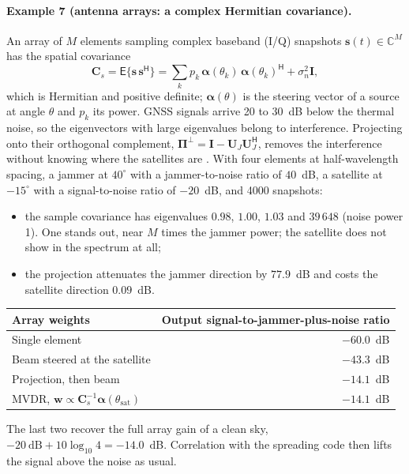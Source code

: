 \documentclass[main.tex]{subfiles}
\begin{document}
\paragraph{Example 7 (antenna arrays: a complex Hermitian covariance).}
\label{la:ex7}%
An array of $M$ elements sampling complex baseband (I/Q) snapshots
$\bm{s}(t) \in \mathbb{C}^M$ has the spatial covariance
\begin{equation}
\bm{C}_s = \mathsf{E}\{\bm{s}\,\bm{s}^{\mathsf{H}}\}
  = \sum_k p_k\,\bm{\alpha}(\theta_k)\,\bm{\alpha}(\theta_k)^{\mathsf{H}}
  + \sigma_n^2\bm{I},
\label{eq:la-array}
\end{equation}
which is Hermitian and positive definite; $\bm{\alpha}(\theta)$ is the
steering vector of a source at angle $\theta$ and $p_k$ its power.  GNSS
signals arrive 20 to 30~dB below the thermal noise, so the eigenvectors with
large eigenvalues belong to interference.  Projecting onto their orthogonal
complement,
$\bm{\Pi}^{\perp} = \bm{I} - \bm{U}_J\bm{U}_J^{\mathsf{H}}$,
removes the interference without knowing where the satellites are
\cite{kaplan2017understanding}.  With four elements at half-wavelength
spacing, a jammer at $40^\circ$ with a jammer-to-noise ratio of $40$~dB, a
satellite at $-15^\circ$ with a signal-to-noise ratio of $-20$~dB, and 4000
snapshots:
\begin{itemize}[leftmargin=*, itemsep=1pt]
\item the sample covariance has eigenvalues $0.98$, $1.00$, $1.03$ and
      $39\,648$ (noise power 1).  One stands out, near $M$ times the jammer
      power; the satellite does not show in the spectrum at all;
\item the projection attenuates the jammer direction by $77.9$~dB and costs
      the satellite direction $0.09$~dB.
\end{itemize}
\begin{center}
\small
\begin{tabular}{@{}lr@{}}
\toprule
Array weights & Output signal-to-jammer-plus-noise ratio \\
\midrule
Single element & $-60.0$~dB \\
Beam steered at the satellite & $-43.3$~dB \\
Projection, then beam & $-14.1$~dB \\
MVDR, $\bm{w} \propto \bm{C}_s^{-1}\bm{\alpha}(\theta_{\mathrm{sat}})$ & $-14.1$~dB \\
\bottomrule
\end{tabular}
\end{center}
The last two recover the full array gain of a clean sky,
$-20~\mathrm{dB} + 10\log_{10}4 = -14.0$~dB.  Correlation with the spreading
code then lifts the signal above the noise as usual.
\end{document}
